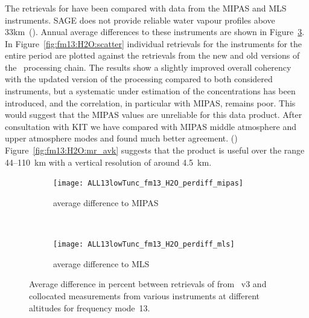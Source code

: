 \subsubsection{}
\label{sec:fm13:comparison:H2O}
The retrievals for  have been compared with data from the MIPAS
and MLS instruments. SAGE does not provide reliable water vapour profiles
above 33km~(\cite{VDS:2016}). Annual average differences to these instruments
are shown in Figure~\ref{fig:fm13:H2O:profiles}. In
Figure~\ref{fig:fm13:H2O:scatter} individual retrievals for the instruments
for the entire period are plotted against the retrievals from the new and old
versions of the \smr\ processing chain. The results show a slightly improved
overall coherency with the updated version of the processing compared to both
considered instruments, but a systematic under estimation of the
concentrations has been introduced, and the correlation, in particular with
MIPAS, remains poor. This would suggest that the MIPAS values are unreliable
for this data product. After consultation with KIT we have compared with
MIPAS middle atmosphere and upper atmosphere modes and found much better
agreement. (\cite{grieco2020b}) Figure~\ref{fig:fm13:H2O:mr_avk} suggests
that the product is useful over the range 44--110~km with a vertical
resolution of around 4.5~km.


\begin{figure}[tbhp]
    \centering
    \begin{subfigure}[b]{0.49\textwidth}
        \texttt{[image: ALL13lowTunc\_fm13\_H2O\_perdiff\_mipas]}
        \caption{average difference to MIPAS}
        \label{fig:fm13:H2O:profiles:MIPAS}
    \end{subfigure}
    \,
    \begin{subfigure}[b]{0.49\textwidth}
        \texttt{[image: ALL13lowTunc\_fm13\_H2O\_perdiff\_mls]}
        \caption{average difference to MLS}
        \label{fig:fm13:H2O:profiles:MLS}
    \end{subfigure}
    \caption{Average difference in percent between retrievals of 
    from \smr~v3 and collocated measurements from various instruments at
    different altitudes for frequency mode~13.}

    \label{fig:fm13:H2O:profiles}
\end{figure}


